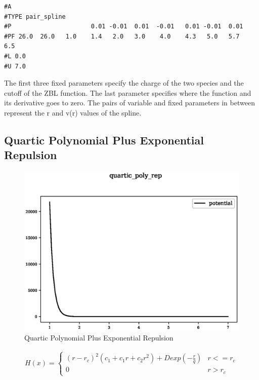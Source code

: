 \begin{lstlisting}[style=sPseudo,caption={Pair Spline}]
#A
#TYPE pair_spline
#P                      0.01 -0.01  0.01  -0.01   0.01 -0.01  0.01 
#PF 26.0  26.0   1.0    1.4   2.0   3.0    4.0    4.3   5.0   5.7    6.5 
#L 0.0 
#U 7.0 
\end{lstlisting}

The first three fixed parameters specify the charge of the two species and the cutoff of the ZBL function.  The last parameter specifies where the function and its derivative goes to zero.  The pairs of variable and fixed parameters in between represent the r and v(r) values of the spline.




\clearpage
\FloatBarrier
\subsection{Quartic Polynomial Plus Exponential Repulsion}

\begin{figure}[h]
  \begin{center}
    \includegraphics[width=120mm]{appendix/functions/plots/quartic_poly_rep.eps}
    \caption{Quartic Polynomial Plus Exponential Repulsion}
    \label{graph:QuarticPolyPlusExpRep}
  \end{center}
\end{figure}

\begin{equation}
\begin{split}
H(x) = \left\{ \begin{matrix} (r - r_c)^2 (c_1 + c_1 r + c_2 r^2) + D exp(- \frac{r}{q}) & r <= r_c \\  0 & r > r_c \end{matrix} \right . 
\end{split}
\label{eq:simpleSpline}
\end{equation}

